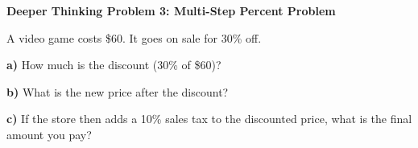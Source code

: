 \documentclass[12pt, letterpaper, fleqn]{article}
\begin{document}
\begin{tcolorbox}[colback=white!15, colframe=black, boxrule=1.5pt, arc=4mm, left=6mm, right=6mm, top=5mm, bottom=5mm]

\textbf{Deeper Thinking Problem 3: Multi-Step Percent Problem}

\medskip

\noindent
A video game costs \$60. It goes on sale for 30\% off.

\vspace{1cm}

\noindent
\textbf{a)} How much is the discount (30\% of \$60)?

\vspace{2cm}

\noindent
\textbf{b)} What is the new price after the discount?

\vspace{2cm}

\noindent
\textbf{c)} If the store then adds a 10\% sales tax to the discounted price, what is the final amount you pay?

\vspace{2cm}

\end{tcolorbox}
\end{document}
